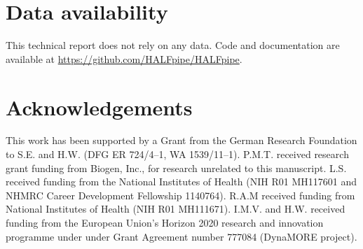 \documentclass{lea}
\begin{document}








\section{Data availability}

This technical report does not rely on any data. Code and documentation are available at \url{https://github.com/HALFpipe/HALFpipe}.

\section{Acknowledgements}

This work has been supported by a Grant from the German Research Foundation to S.E. and H.W. (DFG ER 724/4--1, WA 1539/11--1). P.M.T. received research grant funding from Biogen, Inc., for research unrelated to this manuscript. L.S. received funding from the National Institutes of Health (NIH R01 MH117601 and NHMRC Career Development Fellowship 1140764). R.A.M received funding from National Institutes of Health (NIH R01 MH111671). I.M.V. and H.W. received funding from the European Union's Horizon 2020 research and innovation programme under under Grant Agreement number 777084 (DynaMORE project).

\printbibliography
\end{document}
